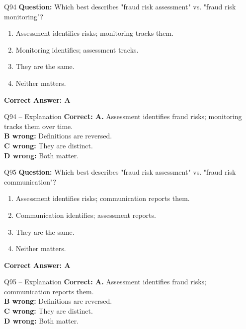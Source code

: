 \documentclass[aspectratio=169,10pt]{beamer}
\begin{document}
	\begin{frame}[t]{Q94}
		\small
		\textbf{Question:} Which best describes "fraud risk assessment" vs. "fraud risk monitoring"?
		\begin{enumerate}[label=\Alph*.,itemsep=1pt,topsep=2pt]
			\item Assessment identifies risks; monitoring tracks them.
			\item Monitoring identifies; assessment tracks.
			\item They are the same.
			\item Neither matters.
		\end{enumerate}
		\vspace{4pt}
		\textbf{Correct Answer: A}
	\end{frame}
	
	\begin{frame}[t]{Q94 -- Explanation}
		\small
		\textbf{Correct: A.} Assessment identifies fraud risks; monitoring tracks them over time. \\[4pt]
		\textbf{B wrong:} Definitions are reversed. \\[2pt]
		\textbf{C wrong:} They are distinct. \\[2pt]
		\textbf{D wrong:} Both matter.
	\end{frame}
	
	\begin{frame}[t]{Q95}
		\small
		\textbf{Question:} Which best describes "fraud risk assessment" vs. "fraud risk communication"?
		\begin{enumerate}[label=\Alph*.,itemsep=1pt,topsep=2pt]
			\item Assessment identifies risks; communication reports them.
			\item Communication identifies; assessment reports.
			\item They are the same.
			\item Neither matters.
		\end{enumerate}
		\vspace{4pt}
		\textbf{Correct Answer: A}
	\end{frame}
	
	\begin{frame}[t]{Q95 -- Explanation}
		\small
		\textbf{Correct: A.} Assessment identifies fraud risks; communication reports them. \\[4pt]
		\textbf{B wrong:} Definitions are reversed. \\[2pt]
		\textbf{C wrong:} They are distinct. \\[2pt]
		\textbf{D wrong:} Both matter.
	\end{frame}
	
\end{document}
